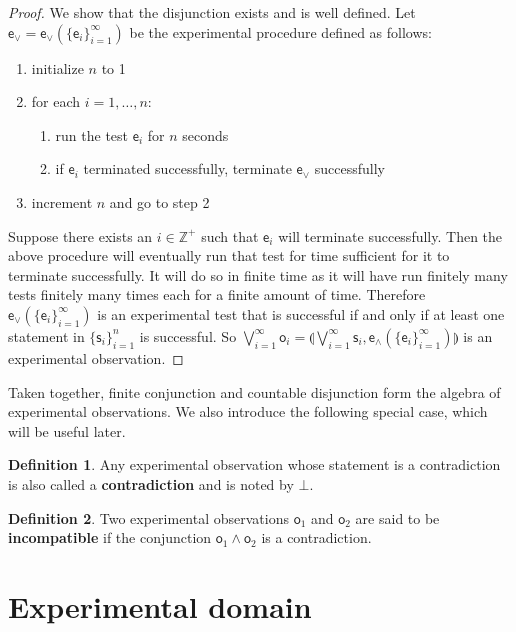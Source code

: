 \documentclass[review]{elsarticle}
\theoremstyle{plain}%
\theoremstyle{definition}
\newtheorem{defn}{Definition}[section]
\theoremstyle{remark}
\begin{document}
\begin{proof}
	We show that the disjunction exists and is well defined. Let $\mathsf{e}_\vee=\mathsf{e}_\vee(\{\mathsf{e}_i\}_{i=1}^{\infty})$ be the experimental procedure defined as follows:
	\begin{enumerate}
	\item initialize $n$ to 1
	\item for each $i=1,\ldots,n$:
	\begin{enumerate}
		\item run the test $\mathsf{e}_i$ for $n$ seconds
		\item if $\mathsf{e}_i$ terminated successfully, terminate $\mathsf{e}_\vee$ successfully
	\end{enumerate}
	\item increment $n$ and go to step 2
	\end{enumerate}
	Suppose there exists an $i \in \mathbb{Z}^+$ such that $\mathsf{e}_i$ will terminate successfully. Then the above procedure will eventually run that test for time sufficient for it to terminate successfully. It will do so in finite time as it will have run finitely many tests finitely many times each for a finite amount of time. Therefore $\mathsf{e}_\vee(\{\mathsf{e}_i\}_{i=1}^{\infty})$ is an experimental test that is successful if and only if at least one statement in $\{\mathsf{s}_i\}_{i=1}^{n}$ is successful. So $\bigvee\limits_{i=1}^{\infty} \mathsf{o}_i =\llparenthesis\bigvee\limits_{i=1}^{\infty} \mathsf{s}_i, \mathsf{e}_{\wedge}(\{\mathsf{e}_i\}_{i=1}^{\infty})\rrparenthesis$ is an experimental observation.
\end{proof}

Taken together, finite conjunction and countable disjunction form the algebra of experimental observations. We also introduce the following special case, which will be useful later.

\begin{defn}
Any experimental observation whose statement is a contradiction is also called a \textbf{contradiction} and is noted by $\bot$.
\end{defn}

\begin{defn}
Two experimental observations $\mathsf{o}_1$ and $\mathsf{o}_2$ are said to be \textbf{incompatible} if the conjunction $\mathsf{o}_1\wedge\mathsf{o}_2$ is a contradiction.
\end{defn}


\section{Experimental domain}
\end{document}
